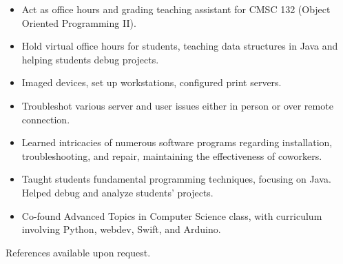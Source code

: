 \documentclass[11pt]{article}
\begin{document}
{{%
\vspace{2mm}
{\fontsize{10}{12}\robotocondlight
    \begin{itemize}[noitemsep,nolistsep]
        \item Act as office hours and grading teaching assistant for CMSC 132 (Object Oriented Programming II).
        \item Hold virtual office hours for students, teaching data structures in Java and helping students debug projects.
    \end{itemize}
    \vspace{3mm}

    \begin{itemize}[noitemsep,nolistsep]
        \item Imaged devices, set up workstations, configured print servers. 
        \item Troubleshot various server and user issues either in person or over remote connection.
        \item Learned intricacies of numerous software programs regarding installation, troubleshooting, and repair, maintaining the effectiveness of coworkers. 
    \end{itemize}
    \vspace{3mm}
    \begin{itemize}[noitemsep,nolistsep]
        \item Taught students fundamental programming techniques, focusing on Java. Helped debug and analyze students’ projects. 
        \item Co-found Advanced Topics in Computer Science class, with curriculum involving Python, webdev, Swift, and Arduino. 
    \end{itemize}
    \vspace{3mm}

\vspace{-2mm}
{\fontsize{8}{10}\robotocondlight References available upon request.}
}
\vspace{-5mm}
\hsep
\vspace{-3mm}

}}
\end{document}

